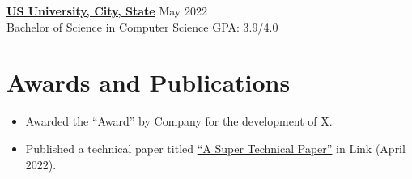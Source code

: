 \textbf{\href{https://www.amrita.edu/}{US University, City, State}} \hfill May 2022 \\
Bachelor of Science in Computer Science \hfill GPA: 3.9/4.0 \\

\section*{Awards and Publications}
\begin{itemize}
  \item Awarded the ``Award'' by Company for the development of X.
  \item Published a technical paper titled \href{https://link.com/a} {``A Super Technical Paper''} in Link (April 2022).  
\end{itemize}


